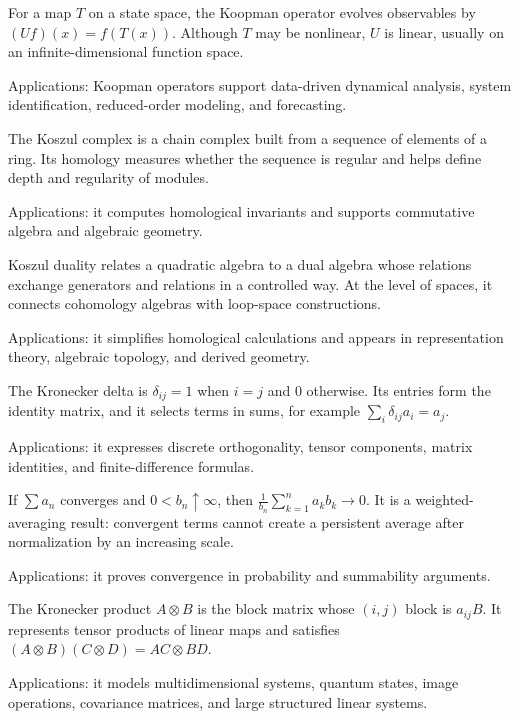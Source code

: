 For a map $T$ on a state space, the Koopman operator evolves observables by $(Uf)(x)=f(T(x))$. Although $T$ may be nonlinear, $U$ is linear, usually on an infinite-dimensional function space. \par\noindent Applications: Koopman operators support data-driven dynamical analysis, system identification, reduced-order modeling, and forecasting.

The Koszul complex is a chain complex built from a sequence of elements of a ring. Its homology measures whether the sequence is regular and helps define depth and regularity of modules. \par\noindent Applications: it computes homological invariants and supports commutative algebra and algebraic geometry.

Koszul duality relates a quadratic algebra to a dual algebra whose relations exchange generators and relations in a controlled way. At the level of spaces, it connects cohomology algebras with loop-space constructions. \par\noindent Applications: it simplifies homological calculations and appears in representation theory, algebraic topology, and derived geometry.

The Kronecker delta is $\delta_{ij}=1$ when $i=j$ and $0$ otherwise. Its entries form the identity matrix, and it selects terms in sums, for example $\sum_i\delta_{ij}a_i=a_j$. \par\noindent Applications: it expresses discrete orthogonality, tensor components, matrix identities, and finite-difference formulas.

If $\sum a_n$ converges and $0<b_n\uparrow\infty$, then $\frac1{b_n}\sum_{k=1}^n a_kb_k\to0$. It is a weighted-averaging result: convergent terms cannot create a persistent average after normalization by an increasing scale. \par\noindent Applications: it proves convergence in probability and summability arguments.

The Kronecker product $A\otimes B$ is the block matrix whose $(i,j)$ block is $a_{ij}B$. It represents tensor products of linear maps and satisfies $(A\otimes B)(C\otimes D)=AC\otimes BD$. \par\noindent Applications: it models multidimensional systems, quantum states, image operations, covariance matrices, and large structured linear systems.

